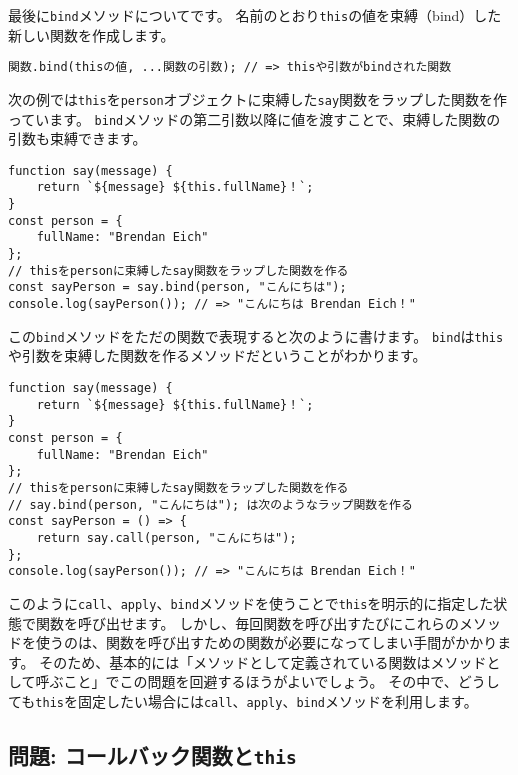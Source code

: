 最後に\texttt{bind}メソッドについてです。
名前のとおり\texttt{this}の値を束縛（bind）した新しい関数を作成します。

\begin{lstlisting}
関数.bind(thisの値, ...関数の引数); // => thisや引数がbindされた関数
\end{lstlisting}

次の例では\texttt{this}を\texttt{person}オブジェクトに束縛した\texttt{say}関数をラップした関数を作っています。
\texttt{bind}メソッドの第二引数以降に値を渡すことで、束縛した関数の引数も束縛できます。

\begin{lstlisting}
function say(message) {
    return `${message} ${this.fullName}！`;
}
const person = {
    fullName: "Brendan Eich"
};
// thisをpersonに束縛したsay関数をラップした関数を作る
const sayPerson = say.bind(person, "こんにちは");
console.log(sayPerson()); // => "こんにちは Brendan Eich！"
\end{lstlisting}

この\texttt{bind}メソッドをただの関数で表現すると次のように書けます。
\texttt{bind}は\texttt{this}や引数を束縛した関数を作るメソッドだということがわかります。

\begin{lstlisting}
function say(message) {
    return `${message} ${this.fullName}！`;
}
const person = {
    fullName: "Brendan Eich"
};
// thisをpersonに束縛したsay関数をラップした関数を作る
// say.bind(person, "こんにちは"); は次のようなラップ関数を作る
const sayPerson = () => {
    return say.call(person, "こんにちは");
};
console.log(sayPerson()); // => "こんにちは Brendan Eich！"
\end{lstlisting}

このように\texttt{call}、\texttt{apply}、\texttt{bind}メソッドを使うことで\texttt{this}を明示的に指定した状態で関数を呼び出せます。
しかし、毎回関数を呼び出すたびにこれらのメソッドを使うのは、関数を呼び出すための関数が必要になってしまい手間がかかります。
そのため、基本的には「メソッドとして定義されている関数はメソッドとして呼ぶこと」でこの問題を回避するほうがよいでしょう。
その中で、どうしても\texttt{this}を固定したい場合には\texttt{call}、\texttt{apply}、\texttt{bind}メソッドを利用します。

\hypertarget{callback-and-this}{%
\subsection{\texorpdfstring{問題:
コールバック関数と\texttt{this}}{問題: コールバック関数とthis}}\label{callback-and-this}}

